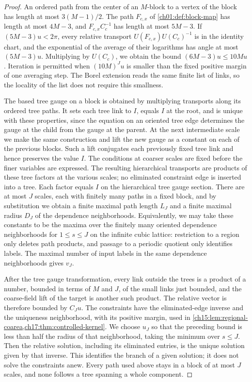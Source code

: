 \begin{proof}
An ordered path from the center of an $M$-block to a vertex of the block has length at most $3(M-1)/2$. The path $F_{c,x}$ of \cref{ch01:def:block-map} has length at most $4M-3$, and $F_{c,x}C_c^{-1}$ has length at most $5M-3$. If $(5M-3)u<2\pi$, every relative transport $U(F_{c,x})U(C_c)^{-1}$ is in the identity chart, and the exponential of the average of their logarithms has angle at most $(5M-3)u$. Multiplying by $U(C_c)$, we obtain the bound $(6M-3)u\le10Mu$. Iteration is permitted when $(10M)^Ju$ is smaller than the fixed positive margin of one averaging step. The Borel extension reads the same finite list of links, so the locality of the list does not require this smallness.

The based tree gauge on a block is obtained by multiplying transports along its ordered tree paths. It sets each tree link to $I$, equals $I$ at the root, and is unique with these properties, since the equation on an oriented tree edge determines the gauge at the child from the gauge at the parent. At the next intermediate scale we make the same construction and lift the new gauge as a constant on each of the previous blocks. Such a lift conjugates each previously fixed tree link and hence preserves the value $I$. The conditions at coarser scales are fixed before the finer variables are expressed. The resulting hierarchical transports are products of these tree factors at the various scales; no eliminated constraint edge is inserted into a tree. Each factor equals $I$ on the hierarchical tree gauge section. There are at most $J$ scales, each with finitely many paths in a fixed block, and by substitution we obtain a finite maximal path length $L_J$ and a finite maximal radius $D_J$ of the dependence neighborhoods. Equivalently, we may take these constants to be the maxima over the finitely many oriented dependence neighborhoods for $1\le s\le J$ on the infinite cubic lattice: restriction to a region only deletes path products, and passage to a periodic quotient only identifies labels. The maximal number of input labels in the same dependence neighborhoods gives $v_J$.

After the tree gauge transformation, every link outside the trees is a product of a number, bounded in terms of $M$ and $J$, of the small links just bounded, and the coarse-field lift of the target is another such product. The relative vector is therefore bounded by $C_Ju$. The constraints have the eliminated-edge inverse and the uniqueness neighborhood, with its positive margin, used in \cref{ch15:lem:regional-coarea,ch17:thm:controlled-kernel}. We choose $u_J$ so that the preceding bound is less than half the radius of that neighborhood, taking the minimum over $s\le J$. Then the relative solution, including its eliminated entries, is the unique solution given by that inverse. This identifies the branch of a given solution; it does not solve the constraints anew. Every path used above stays in a block of at most $J$ scales, and none follows a tree spanning a whole component.
\end{proof}

